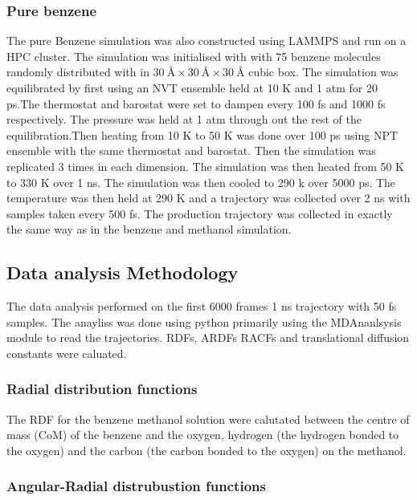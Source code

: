 \documentclass{report}
\begin{document}
\subsubsection{Pure benzene}

The pure Benzene simulation was also constructed using LAMMPS and run on a HPC cluster. The simulation was initialised with with 75 benzene molecules randomly distributed with in $30\:\si{\angstrom} \times 30\:\si{\angstrom} \times 30\:\si{\angstrom}$ cubic box. The simulation was equilibrated by first using an NVT ensemble held at 10 K and 1 atm for 20 ps.The thermostat and barostat were set to dampen every 100 fs and 1000 fs respectively. The pressure was held at 1 atm through out the rest of the equilibration.Then heating from 10 K to 50 K was done over 100 ps using NPT ensemble with the same thermostat and barostat. Then the simulation was replicated 3 times in each dimension. The simulation was then heated from 50 K to 330 K over 1 ns. The simulation was then cooled to 290 k over 5000 ps. The temperature was then  held at 290 K and a trajectory was collected over 2 ns with samples taken every 500 fs. The production trajectory was collected in exactly the same way as in the benzene and methanol simulation.

\subsection{Data analysis Methodology}

The data analysis performed on the first 6000 frames  1 ns trajectory with 50 fs samples. The anayliss was done using python primarily using the MDAnanlsysis module to read the trajectories. RDFs, ARDFs RACFs and translational diffusion constants were caluated.

\subsubsection{Radial distribution functions}

The RDF for the benzene methanol solution were calutated between the centre of mass (CoM) of the benzene and the oxygen, hydrogen (the hydrogen bonded to the oxygen) and the carbon (the carbon bonded to the oxygen) on the methanol. 

\subsubsection{Angular-Radial distrubustion functions}
\end{document}
